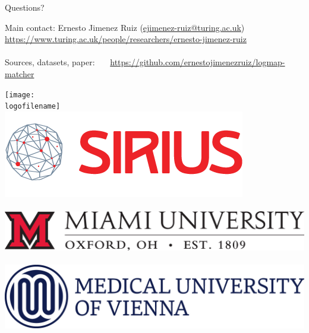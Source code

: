 \documentclass[t]{beamer}
\begin{document}
\begin{frame}{Questions?}
	
	
	Main contact:
	Ernesto Jimenez Ruiz (\url{ejimenez-ruiz@turing.ac.uk})
	\url{https://www.turing.ac.uk/people/researchers/ernesto-jimenez-ruiz}
	\\~\\
	Sources, datasets, paper: 
	~~~\url{https://github.com/ernestojimenezruiz/logmap-matcher}
	
	\vspace{1.1cm}
	
	\texttt{[image: \\logofilename]}~~
	\includegraphics[height=1.4\gridblock]{images/sirius-logo.png}
	\\~~\\
	\includegraphics[height=1.0\gridblock]{images/muo.jpg}~~
	\includegraphics[height=1.2\gridblock]{images/muv.jpg}
		    
	\finalpage 
\end{frame}
\end{document}
